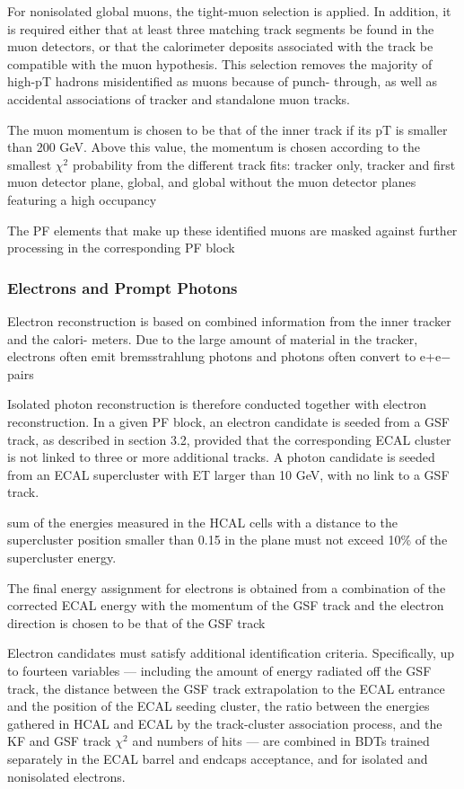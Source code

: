 For nonisolated global muons, the tight-muon selection is applied. In addition, it is required either that at least three matching track segments be found in the muon detectors, or that the calorimeter deposits associated with the track be compatible with the muon hypothesis. This selection removes the majority of high-pT hadrons misidentified as muons because of punch- through, as well as accidental associations of tracker and standalone muon tracks.

The muon momentum is chosen to be that of the inner track if its pT is smaller than 200 GeV. Above this value, the momentum is chosen according to the smallest $\chi^2$ probability from the different track fits: tracker only, tracker and first muon detector plane, global, and global without the muon detector planes featuring a high occupancy

The PF elements that make up these identified muons are masked against further processing in the corresponding PF block

\subsubsection{Electrons and Prompt Photons}

Electron reconstruction is based on combined information from the inner tracker and the calori- meters. Due to the large amount of material in the tracker, electrons often emit bremsstrahlung photons and photons often convert to e+e− pairs

Isolated photon reconstruction is therefore conducted together with electron reconstruction. In a given PF block, an electron candidate is seeded from a GSF track, as described in section 3.2, provided that the corresponding ECAL cluster is not linked to three or more additional tracks. A photon candidate is seeded from an ECAL supercluster with ET larger than 10 GeV, with no link to a GSF track.

sum of the energies measured in the HCAL cells with a distance to the supercluster position smaller than 0.15 in the \etaphi plane must not exceed 10\% of the supercluster energy.

The final energy assignment for electrons is obtained from a combination of the corrected ECAL energy with the momentum of the GSF track and the electron direction is chosen to be that of the GSF track

Electron candidates must satisfy additional identification criteria. Specifically, up to fourteen variables — including the amount of energy radiated off the GSF track, the distance between the GSF track extrapolation to the ECAL entrance and the position of the ECAL seeding cluster, the ratio between the energies gathered in HCAL and ECAL by the track-cluster association process, and the KF and GSF track $\chi^2$ and numbers of hits — are combined in BDTs trained separately in the ECAL barrel and endcaps acceptance, and for isolated and nonisolated electrons.

